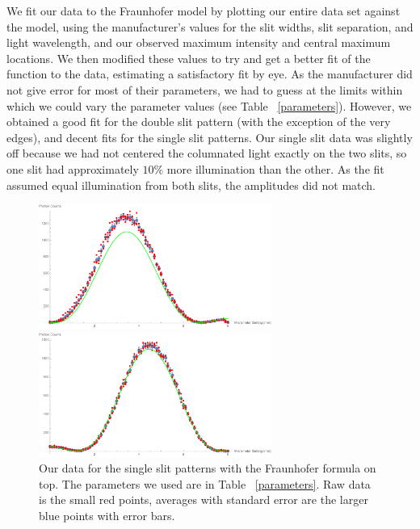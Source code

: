\documentclass[prb,preprint]{revtex4-1}
\begin{document}
We fit our data to the Fraunhofer model by plotting our entire data set against the model, using the manufacturer's values for the slit widths, slit separation, and light wavelength, and our observed maximum intensity and central maximum locations.  We then modified these values to try and get a better fit of the function to the data, estimating a satisfactory fit by eye.  As the manufacturer did not give error for most of their parameters, we had to guess at the limits within which we could vary the parameter values (see Table ~\ref{parameters}). However, we obtained a good fit for the double slit pattern (with the exception of the very edges), and decent fits for the single slit patterns.  Our single slit data was slightly off because we had not centered the columnated light exactly on the two slits, so one slit had approximately $10\%$ more illumination than the other.  As the fit assumed equal illumination from both slits, the amplitudes did not match.  

\begin{figure}[h!]
\centering
\begin{minipage}[b]{0.45\linewidth}
	\includegraphics[width=3in]{far_slit_Fraunhofer_plot.pdf}
\end{minipage}
\quad
\begin{minipage}[b]{0.45\linewidth}
	\includegraphics[width=3in]{near_slit_Fraunhofer_plot.pdf}
\end{minipage}
\caption{Our data for the single slit patterns with the Fraunhofer formula on top. The parameters we used are in Table ~\ref{parameters}. Raw data is the small red points, averages with standard error are the larger blue points with error bars. }
\label{single_slits_Fraunhofer_plot}
\end{figure}
\end{document}
